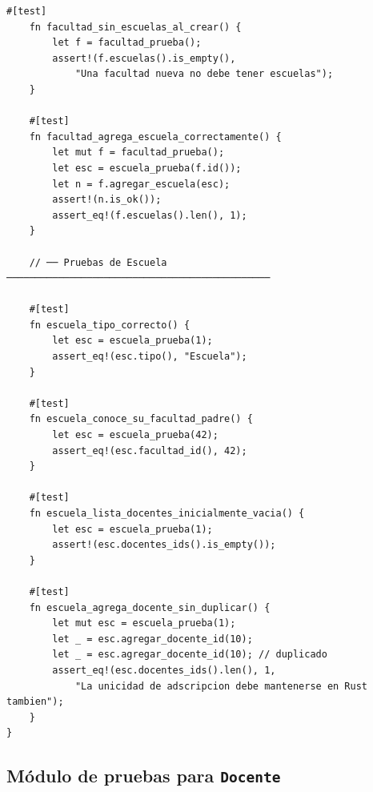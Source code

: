 \begin{lstlisting}[style=rustStyle,
  caption={Módulo de pruebas para los \textit{structs} \texttt{Facultad} y \texttt{Escuela} en \rust.},
  label={lst:rust-pruebas-facultad}]
    #[test]
    fn facultad_sin_escuelas_al_crear() {
        let f = facultad_prueba();
        assert!(f.escuelas().is_empty(),
            "Una facultad nueva no debe tener escuelas");
    }

    #[test]
    fn facultad_agrega_escuela_correctamente() {
        let mut f = facultad_prueba();
        let esc = escuela_prueba(f.id());
        let n = f.agregar_escuela(esc);
        assert!(n.is_ok());
        assert_eq!(f.escuelas().len(), 1);
    }

    // ── Pruebas de Escuela ──────────────────────────────────────────────

    #[test]
    fn escuela_tipo_correcto() {
        let esc = escuela_prueba(1);
        assert_eq!(esc.tipo(), "Escuela");
    }

    #[test]
    fn escuela_conoce_su_facultad_padre() {
        let esc = escuela_prueba(42);
        assert_eq!(esc.facultad_id(), 42);
    }

    #[test]
    fn escuela_lista_docentes_inicialmente_vacia() {
        let esc = escuela_prueba(1);
        assert!(esc.docentes_ids().is_empty());
    }

    #[test]
    fn escuela_agrega_docente_sin_duplicar() {
        let mut esc = escuela_prueba(1);
        let _ = esc.agregar_docente_id(10);
        let _ = esc.agregar_docente_id(10); // duplicado
        assert_eq!(esc.docentes_ids().len(), 1,
            "La unicidad de adscripcion debe mantenerse en Rust tambien");
    }
}
\end{lstlisting}

\subsection{Módulo de pruebas para \texttt{Docente}}
\label{subsec:rust-prueba-docente}

